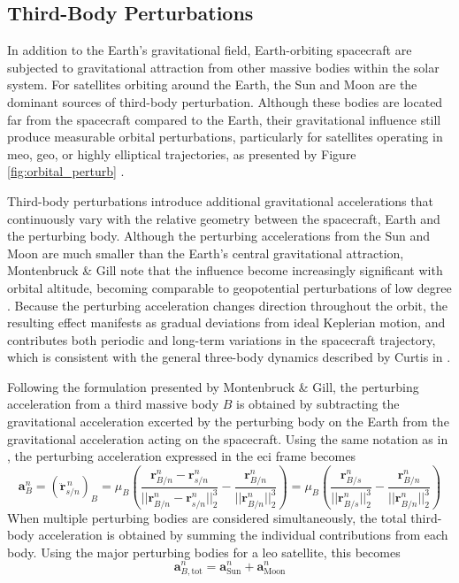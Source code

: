 
\subsection{Third-Body Perturbations}
In addition to the Earth's gravitational field, Earth-orbiting spacecraft are subjected to gravitational attraction from other massive bodies within the solar system. For satellites orbiting around the Earth, the Sun and Moon are the dominant sources of third-body perturbation. Although these bodies are located far from the spacecraft compared to the Earth, their gravitational influence still produce measurable orbital perturbations, particularly for satellites operating in \gls{meo}, \gls{geo}, or highly elliptical trajectories, as presented by Figure \ref{fig:orbital_perturb} \cite{montenbruck2000, hystad2025}. 

Third-body perturbations introduce additional gravitational accelerations that continuously vary with the relative geometry between the spacecraft, Earth and the perturbing body. Although the perturbing accelerations from the Sun and Moon are much smaller than the Earth's central gravitational attraction, Montenbruck \& Gill note that the influence become increasingly significant with orbital altitude, becoming comparable to geopotential perturbations of low degree \cite{montenbruck2000}. Because the perturbing acceleration changes direction throughout the orbit, the resulting effect manifests as gradual deviations from ideal Keplerian motion, and contributes both periodic and long-term variations in the spacecraft trajectory, which is consistent with the general three-body dynamics described by Curtis in \cite{curtis2005orbital}. 

Following the formulation presented by Montenbruck \& Gill, the perturbing acceleration from a third massive body $B$ is obtained by subtracting the gravitational acceleration excerted by the perturbing body on the Earth from the gravitational acceleration acting on the spacecraft. Using the same notation as in \cite{hystad2025}, the perturbing acceleration expressed in the \gls{eci} frame becomes
\begin{equation}
    \textbf{a}^n_B = \left(\ddot{\textbf{r}}^{\,n}_{s/n}\right)_{B} = \mu_B \left( \frac{\textbf{r}_{B/n}^n - \textbf{r}_{s/n}^n}{||\textbf{r}_{B/n}^n - \textbf{r}_{s/n}^n||_2^3} - \frac{\textbf{r}_{B/n}^n}{||\textbf{r}_{B/n}^n||_2^3}\right) = \mu_B \left( \frac{\textbf{r}_{B/s}^n}{||\textbf{r}_{B/s}^n||_2^3} - \frac{\textbf{r}_{B/n}^n}{||\textbf{r}_{B/n}^n||_2^3}\right)
\label{eq:3B}
\end{equation}
When multiple perturbing bodies are considered simultaneously, the total third-body acceleration is obtained by summing the 
individual contributions from each body. Using the major perturbing bodies for a \gls{leo} satellite, this becomes
\begin{equation}
    \mathbf{a}_{B,\text{tot}}^n = \mathbf{a}_{\text{Sun}}^n + \mathbf{a}_{\text{Moon}}^n
\end{equation}


